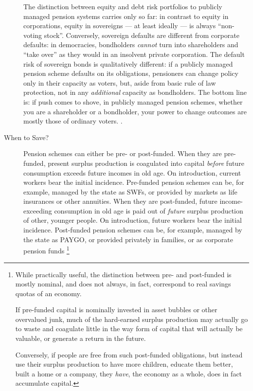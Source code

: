 \documentclass[11pt,a4paper,oneside,openright]{article}
\begin{document}
\begin{description}
{		The distinction between equity and debt risk portfolios to publicly managed pension systems carries only so far: 
		in contrast to equity in corporations, equity in sovereigns --- at least ideally --- is always ``non-voting stock''. 
		Conversely, sovereign defaults are different from corporate defaults: 
		in democracies, bondholders \emph{cannot} turn into shareholders and ``take over'' as they would in an insolvent private corporation. 
		The default risk of sovereign bonds is qualitatively different: 
		if a publicly managed pension scheme defaults on its obligations, pensioners can change policy only in their capacity as voters, but, aside from basic rule of law protection, not in any \emph{additional} capacity as bondholders. 
		The bottom line is: 
		if push comes to shove, in publicly managed pension schemes, whether you are a shareholder or a bondholder, your power to change outcomes are mostly those of ordinary voters.
	}.
	\item[When to Save?] 
	Pension schemes can either be pre- or post-funded.
	When they are pre-funded, present surplus production is coagulated into capital \emph{before} future consumption exceeds future incomes in old age. 
	On introduction, current workers bear the initial incidence. 
	Pre-funded pension schemes can be, for example, managed by the state as \glspl{SWF}, or provided by markets as life insurances or other annuities.
	When they are post-funded, future income-exceeding consumption in old age is paid out of \emph{future} surplus production of other, younger people. 
	On introduction, future workers bear the initial incidence. 
	Post-funded pension schemes can be, for example, managed by the state as PAYGO, or provided privately in families, or as corporate pension funds
	\footnote{
		While practically useful, the distinction between pre- and post-funded is mostly nominal, and does not always, in fact, correspond to real savings quotas of an economy. 
		
		If pre-funded capital is nominally invested in asset bubbles or other overvalued junk, much of the hard-earned surplus production may actually go to waste and coagulate little in the way form of capital that will actually be valuable, or generate a return in the future. 
		
		Conversely, if people are free from such post-funded obligations, but instead use their surplus production to have more children, educate them better, built a home or a company, they \emph{have}, the economy as a whole, does in fact accumulate capital. 

}
\end{description}
\end{document}
